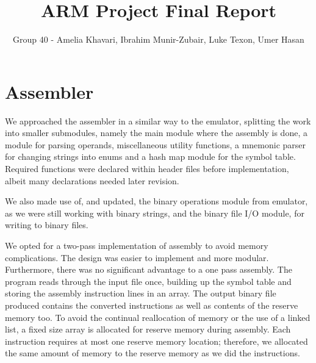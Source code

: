 \documentclass[11pt]{article}
\begin{document}
\title{ARM Project Final Report}
\author{Group 40 - Amelia Khavari, Ibrahim Munir-Zubair, Luke Texon, Umer Hasan}

\maketitle

\section{Assembler}
We approached the assembler in a similar way to the emulator, splitting the work into smaller submodules, namely the main module where the assembly is done, a module for parsing operands, miscellaneous utility functions, a mnemonic parser for changing strings into enums and a hash map module for the symbol table. Required functions were declared within header files before implementation, albeit many declarations needed later revision.

We also made use of, and updated, the binary operations module from emulator, as we were still working with binary strings, and the binary file I/O module, for writing to binary files.     

We opted for a two-pass implementation of assembly to avoid memory complications. The design was easier to implement and more modular. Furthermore, there was no significant advantage to a one pass assembly. 
The program reads through the input file once, building up the symbol table and storing the assembly instruction lines in an array. The output binary file produced contains the converted instructions as well as contents of the reserve memory too. To avoid the continual reallocation of memory or the use of a linked list, a fixed size array is allocated for reserve memory during assembly. Each instruction requires at most one reserve memory location; therefore, we allocated the same amount of memory to the reserve memory as we did the instructions.
\end{document}
